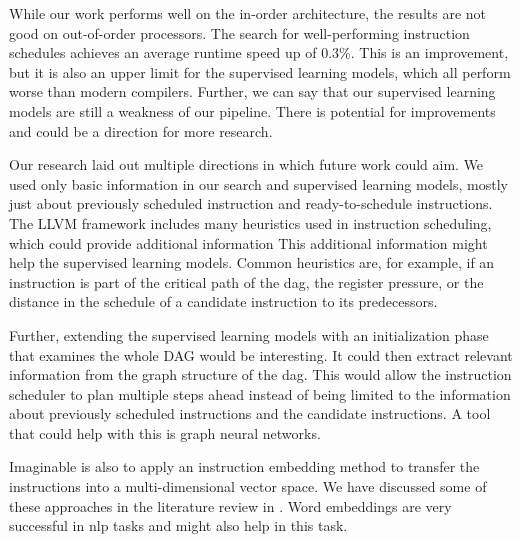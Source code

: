 While our work performs well on the in-order architecture, the results are not good on out-of-order processors.
The search for well-performing instruction schedules achieves an average runtime speed up of 0.3\%.
This is an improvement, but it is also an upper limit for the supervised learning models, which all perform worse than modern compilers.
Further, we can say that our supervised learning models are still a weakness of our pipeline.
There is potential for improvements and could be a direction for more research.
 
Our research laid out multiple directions in which future work could aim.
We used only basic information in our search and supervised learning models, mostly just about previously scheduled instruction and ready-to-schedule instructions.
The LLVM framework includes many heuristics used in instruction scheduling, which could provide additional information
This additional information might help the supervised learning models.
Common heuristics are, for example, if an instruction is part of the critical path of the \ac{dag}, the register pressure, or the distance in the schedule of a candidate instruction to its predecessors.

Further, extending the supervised learning models with an initialization phase that examines the whole DAG would be interesting.
It could then extract relevant information from the graph structure of the \ac{dag}.
This would allow the instruction scheduler to plan multiple steps ahead instead of being limited to the information about previously scheduled instructions and the candidate instructions.
A tool that could help with this is graph neural networks.

Imaginable is also to apply an instruction embedding method to transfer the instructions into a multi-dimensional vector space.
We have discussed some of these approaches in the literature review in .
Word embeddings are very successful in \ac{nlp} tasks and might also help in this task.









